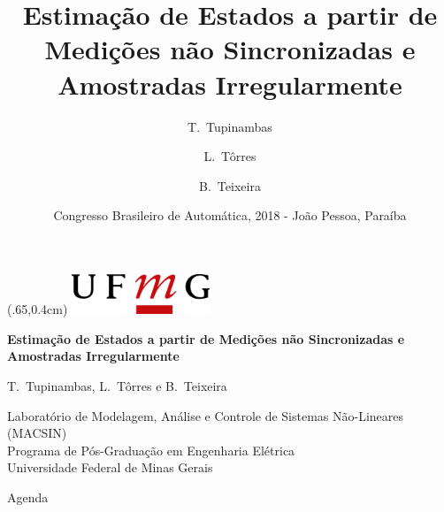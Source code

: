 \documentclass{beamer}
\title[Estimação com Amostragem Irregular]{Estimação de Estados a partir de Medições não Sincronizadas e Amostradas Irregularmente}
\author{T.~Tupinambas\inst{1} \and L.~Tôrres\inst{1} \and B.~Teixeira\inst{1}}
\institute[] %
{
  \inst{1}%
  Programa de Pós-Graduação em Engenharia Elétrica\\
  Universidade Federal de Minas Gerais}
\date[CBA, 2018 - João Pessoa/PB]{Congresso Brasileiro de Automática, 2018 - João Pessoa, Paraíba}
\begin{document}
{

%

	\begin{frame}
		\begin{textblock*}{100mm}(.65\textwidth,0.4cm)
			\includegraphics[height=1.2cm,width=4.14cm]{template/ufmg.png}
		\end{textblock*}
		\centering
		\vspace{3.5cm}
		\Large
		\textbf{Estimação de Estados a partir de Medições não Sincronizadas e Amostradas Irregularmente}
		
		
		\normalsize
		\vspace{0.5cm}
		T.~Tupinambas, L.~Tôrres e B.~Teixeira
			
		\vspace{0.5cm}
		Laboratório de Modelagem, Análise e Controle de Sistemas Não-Lineares\\
		(MACSIN)\\
		Programa de Pós-Graduação em Engenharia Elétrica\\
		Universidade Federal de Minas Gerais
	\end{frame}
}
\addtocounter{framenumber}{-1}

{
	\setbeamertemplate{footline}{}
	\begin{frame}{Agenda}
  		\tableofcontents
	\end{frame}
	\addtocounter{framenumber}{-1}
}
\end{document}
